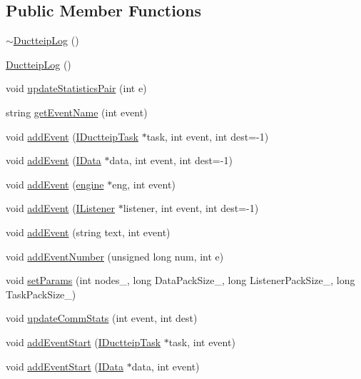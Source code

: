 \subsection*{Public Member Functions}
\begin{DoxyCompactItemize}
\item 
\hyperlink{class_ductteip_log_a96b0e451e6c8ea07d1b2aa7b2650da10}{$\sim$DuctteipLog} ()
\item 
\hyperlink{class_ductteip_log_a55c3b05ea27df799f28f4ecb14be5e17}{DuctteipLog} ()
\item 
void \hyperlink{class_ductteip_log_a10e6b8ed2cea31010e9937b5d0f5e685}{updateStatisticsPair} (int e)
\item 
string \hyperlink{class_ductteip_log_a080df86b3f7167341da836494af41822}{getEventName} (int event)
\item 
void \hyperlink{class_ductteip_log_a2038f71b600647a1899da3a0022f9fc1}{addEvent} (\hyperlink{class_i_ductteip_task}{IDuctteipTask} $\ast$task, int event, int dest=-\/1)
\item 
void \hyperlink{class_ductteip_log_abdacf59e313a1e510c76e84c22082287}{addEvent} (\hyperlink{class_i_data}{IData} $\ast$data, int event, int dest=-\/1)
\item 
void \hyperlink{class_ductteip_log_afb6106d874d89989c58027cc1ac569e4}{addEvent} (\hyperlink{classengine}{engine} $\ast$eng, int event)
\item 
void \hyperlink{class_ductteip_log_a1bbfbd418561ea58f630f3c5f57694c8}{addEvent} (\hyperlink{class_i_listener}{IListener} $\ast$listener, int event, int dest=-\/1)
\item 
void \hyperlink{class_ductteip_log_adfbc05d93e6d90fc9a2f5a4e74578095}{addEvent} (string text, int event)
\item 
void \hyperlink{class_ductteip_log_a0edeefb537663709b3d284e60ed51b96}{addEventNumber} (unsigned long num, int e)
\item 
void \hyperlink{class_ductteip_log_aa67193a1a86d6f269cd1313c2c96a625}{setParams} (int nodes\_\-, long DataPackSize\_\-, long ListenerPackSize\_\-, long TaskPackSize\_\-)
\item 
void \hyperlink{class_ductteip_log_a3f2679d12c317c14c06ac0a23243cb6a}{updateCommStats} (int event, int dest)
\item 
void \hyperlink{class_ductteip_log_a6d0afadbba975c706ef756a3ba23fe47}{addEventStart} (\hyperlink{class_i_ductteip_task}{IDuctteipTask} $\ast$task, int event)
\item 
void \hyperlink{class_ductteip_log_a8dca88c37b6ae7b96a58ce6d04053fd9}{addEventStart} (\hyperlink{class_i_data}{IData} $\ast$data, int event)

\end{DoxyCompactItemize}
